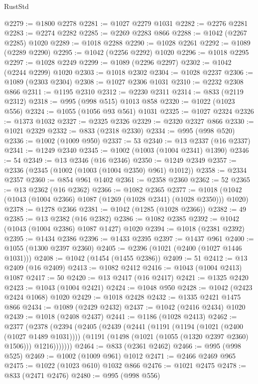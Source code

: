\begin{lexlean}{RustStd}
\begin{coremodule}
{\begin{coremodule}
{{{{{{{{{{{{{{{{{{{{{{{{{{@2279 := @1800 @2278
@2281 := @1027 @2279 @1031
@2282 := @2276 @2281
@2283 := @2274 @2282
@2285 := @2269 @2283 @866
@2288 := @1042 (@2267 @2285) @1020
@2289 := @1018 @2288
@2290 := @1028 @2261
@2292 := @1089 (@2289 @2290)
@2295 := @1042 (@2256 @2292) @1020
@2296 := @1018 @2295
@2297 := @1028 @2249
@2299 := @1089 (@2296 @2297)
@2302 := @1042 (@2244 @2299) @1020
@2303 := @1018 @2302
@2304 := @1028 @2237
@2306 := @1089 (@2303 @2304)
@2308 := @1027 @2306 @1031
@2310 := @2232 @2308 @866
@2311 := @1195 @2310
@2312 := @2230 @2311
@2314 := @833 (@2119 @2312)
@2318 := @995 (@998 @515) @1013 @858
@2320 := @1022 (@1023 @556)
@2324 := @1055 (@1056 @93 @561) @1031
@2325 := @1027 @2324
@2326 := @1373 @1032
@2327 := @2325 @2326
@2329 := @2320 @2327 @866
@2330 := @1021 @2329
@2332 := @833 (@2318 @2330)
@2334 := @995 (@998 @520)
@2336 := @1002 (@1009 @950)
@2337 := 53
@2340 := @13 @2337 (@16 @2337)
@2341 := @1249 @2340
@2345 := @1002 (@1003 (@1004 @2341) @1390)
@2346 := 54
@2349 := @13 @2346 (@16 @2346)
@2350 := @1249 @2349
@2357 := @2336 (@2345 (@1002 (@1003 (@1004 @2350) @961) @1012))
@2358 := @2334 @2357
@2360 := @854 @961 @1402
@2361 := @2358 @2360
@2362 := 52
@2365 := @13 @2362 (@16 @2362)
@2366 := @1082 @2365
@2377 := @1018 (@1042 (@1043 (@1004 @2366) @1087 (@1269 (@1028 @2341) (@1028 @2350))) @1020)
@2378 := @1278 @2366
@2381 := @1042 (@1285 (@1028 @2366))
@2382 := 49
@2385 := @13 @2382 (@16 @2382)
@2386 := @1082 @2385
@2392 := @1042 (@1043 (@1004 @2386) @1087 @1427) @1020
@2394 := @1018 (@2381 @2392)
@2395 := @1434 @2386
@2396 := @1433 @2395
@2397 := @1437 @961
@2400 := @1055 (@1300 @2397 @2360)
@2405 := @2396 (@1021 (@2400 (@1027 @1446 @1031)))
@2408 := @1042 (@1454 (@1455 @2386))
@2409 := 51
@2412 := @13 @2409 (@16 @2409)
@2413 := @1082 @2412
@2416 := @1043 (@1004 @2413) @1087
@2417 := 50
@2420 := @13 @2417 (@16 @2417)
@2421 := @1325 @2420
@2423 := @1043 (@1004 @2421)
@2424 := @1048 @950
@2428 := @1042 (@2423 @2424 @1068) @1020
@2429 := @1018 @2428
@2432 := @1335 @2421 @1475 @866
@2434 := @1089 (@2429 @2432)
@2437 := @1042 (@2416 @2434) @1020
@2439 := @1018 (@2408 @2437)
@2441 := @1186 (@1028 @2413)
@2462 := @2377
    (@2378
      (@2394
        (@2405
          (@2439
            (@2441
              (@1191
                (@1194 (@1021 (@2400 (@1027 @1489 @1031))))
                (@1191 (@1498 (@1021 (@1055 (@1320 @2397 @2360) @1506))) @1216)))))))
@2464 := @833 (@2361 @2462)
@2466 := @995 (@998 @525)
@2469 := @1002 (@1009 @961) @1012
@2471 := @2466 @2469 @965
@2475 := @1022 (@1023 @610) @1032 @866
@2476 := @1021 @2475
@2478 := @833 (@2471 @2476)
@2480 := @995 (@998 @556)
}}}}}}}}}}}}}}}}}}}}}}}}}}
\end{coremodule}}
\end{coremodule}
\end{lexlean}

